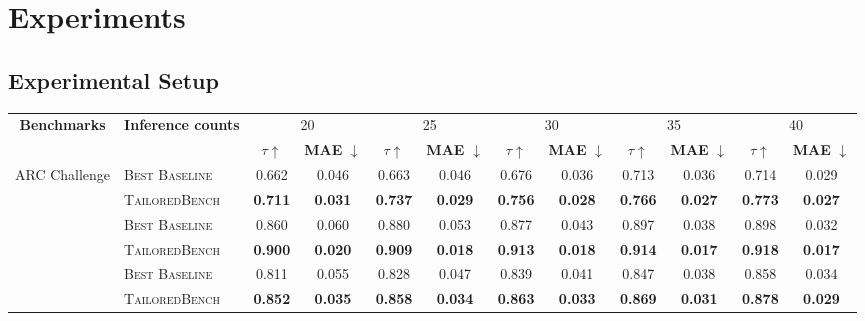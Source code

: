 \section{Experiments}
\subsection{Experimental Setup}
\label{sec:exp-3.1}
\begin{table*}[ht]
\renewcommand\arraystretch{1.2}
\centering
\small
\setlength{\tabcolsep}{0.49em} 
\begin{tabular}{cl*{5}{cc}}
\toprule
\multirow{2}{*}{\textbf{Benchmarks}} & \multirow{2}{*}{\textbf{Inference counts}} & \multicolumn{2}{c}{20} & \multicolumn{2}{c}{25} & \multicolumn{2}{c}{30} & \multicolumn{2}{c}{35} & \multicolumn{2}{c}{40} \\
&  & \textbf{$\tau \uparrow$} & {\scriptsize \textbf{MAE} $\downarrow$}  & \textbf{$\tau \uparrow$} & {\scriptsize \textbf{MAE} $\downarrow$}  & \textbf{$\tau \uparrow$} & {\scriptsize \textbf{MAE} $\downarrow$}  & \textbf{$\tau \uparrow$} & {\scriptsize \textbf{MAE} $\downarrow$}  & \textbf{$\tau \uparrow$} & {\scriptsize \textbf{MAE} $\downarrow$}  \\
\midrule
\multirow{2}{*}{ARC Challenge}&\textsc{Best Baseline} & 0.662 & 0.046 & 0.663 & 0.046 & 0.676 & 0.036 & 0.713 & 0.036 & 0.714 & 0.029 \\
                           & \textsc{TailoredBench} & \textbf{0.711} & \textbf{0.031} & \textbf{0.737} & \textbf{0.029} & \textbf{0.756} & \textbf{0.028} & \textbf{0.766} & \textbf{0.027} & \textbf{0.773} & \textbf{0.027} \\
\hdashline
\multirow{2}{*}{Hellaswag}&\textsc{Best Baseline} & 0.860 & 0.060 & 0.880 & 0.053 & 0.877 & 0.043 & 0.897 & 0.038 & 0.898 & 0.032 \\
                           & \textsc{TailoredBench} & \textbf{0.900} & \textbf{0.020} & \textbf{0.909} & \textbf{0.018} & \textbf{0.913} & \textbf{0.018} & \textbf{0.914} & \textbf{0.017} & \textbf{0.918} & \textbf{0.017} \\
\hdashline
\multirow{2}{*}{GSM8K}&\textsc{Best Baseline} & 0.811 & 0.055 & 0.828 & 0.047 & 0.839 & 0.041 & 0.847 & 0.038 & 0.858 & 0.034 \\
                           &\textsc{TailoredBench} & \textbf{0.852} & \textbf{0.035} & \textbf{0.858} & \textbf{0.034} & \textbf{0.863} & \textbf{0.033} & \textbf{0.869} & \textbf{0.031} & \textbf{0.878} & \textbf{0.029} \\

\end{tabular}
\end{table*}

